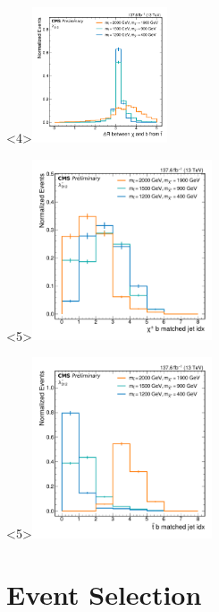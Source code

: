\documentclass[]{beamer}
\begin{document}
\begin{frame}
\begin{center}
      \begin{onlyenv}<4>\includegraphics[width=0.3\textwidth]{figures/chi_b_dr.pdf} \end{onlyenv}
      \begin{onlyenv}<5>\includegraphics[width=0.4\textwidth]{figures/chi_b_jet_idx.pdf} \end{onlyenv}
      \begin{onlyenv}<5>\includegraphics[width=0.4\textwidth]{figures/stop_b_jet_idx.pdf} \end{onlyenv}
    \end{center}
\end{frame}

\section{Event Selection}
\label{sec:event-selection}
\end{document}
